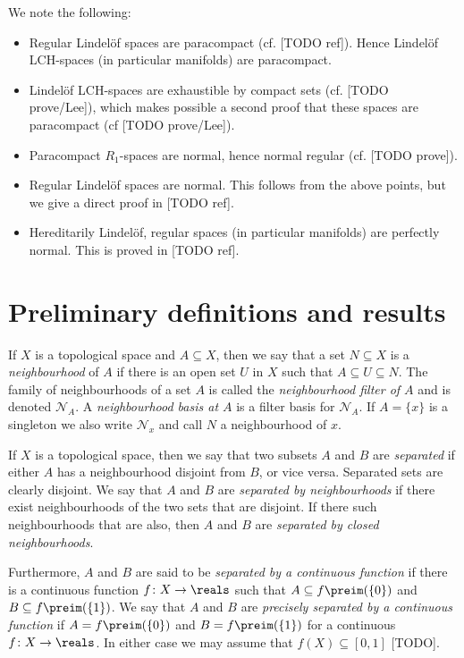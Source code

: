 \documentclass[article, a4paper, 11pt, oneside]{memoir}
\numberwithin{equation}{chapter}
\newcommand{\calN}{\mathcal{N}}
\newcommand{\nhoodfilter}[1]{\calN_{#1}}
\begin{document}
We note the following:
%
\begin{itemize}
    \item Regular Lindelöf spaces are paracompact (cf. [TODO ref]). Hence Lindelöf LCH-spaces (in particular manifolds) are paracompact.
    \item Lindelöf LCH-spaces are exhaustible by compact sets (cf. [TODO prove/Lee]), which makes possible a second proof that these spaces are paracompact (cf [TODO prove/Lee]).
    \item Paracompact $R_1$-spaces are normal, hence normal regular (cf. [TODO prove]).
    \item Regular Lindelöf spaces are normal. This follows from the above points, but we give a direct proof in [TODO ref].
    \item Hereditarily Lindelöf, regular spaces (in particular manifolds) are perfectly normal. This is proved in [TODO ref].
\end{itemize}




\chapter{Preliminary definitions and results}


If $X$ is a topological space and $A \subseteq X$, then we say that a set $N \subseteq X$ is a \emph{neighbourhood} of $A$ if there is an open set $U$ in $X$ such that $A \subseteq U \subseteq N$. The family of neighbourhoods of a set $A$ is called the \emph{neighbourhood filter of $A$} and is denoted $\nhoodfilter{A}$. A \emph{neighbourhood basis at $A$} is a filter basis for $\nhoodfilter{A}$. If $A = \{x\}$ is a singleton we also write $\nhoodfilter{x}$ and call $N$ a neighbourhood of $x$.

If $X$ is a topological space, then we say that two subsets $A$ and $B$ are \emph{separated} if either $A$ has a neighbourhood disjoint from $B$, or vice versa. Separated sets are clearly disjoint. We say that $A$ and $B$ are \emph{separated by neighbourhoods} if there exist neighbourhoods of the two sets that are disjoint. If there such neighbourhoods that are also, then $A$ and $B$ are \emph{separated by closed neighbourhoods}.

Furthermore, $A$ and $B$ are said to be \emph{separated by a continuous function} if there is a continuous function $f \colon X \to \reals$ such that $A \subseteq f\preim(\{0\})$ and $B \subseteq f\preim(\{1\})$. We say that $A$ and $B$ are \emph{precisely separated by a continuous function} if $A = f\preim(\{0\})$ and $B = f\preim(\{1\})$ for a continuous $f \colon X \to \reals$. In either case we may assume that $f(X) \subseteq [0,1]$ [TODO].
\end{document}
